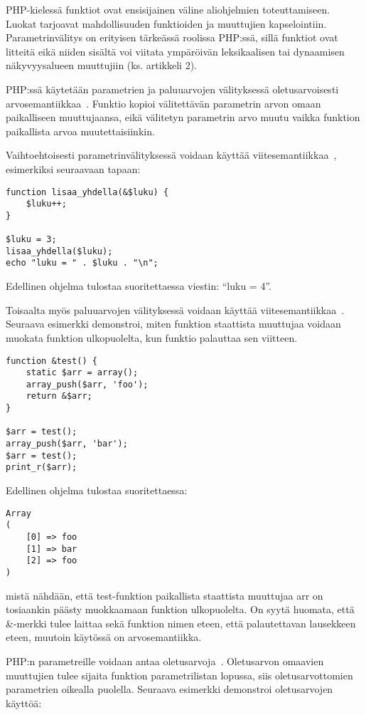 PHP-kielessä funktiot ovat ensisijainen väline aliohjelmien toteuttamiseen. Luokat tarjoavat mahdollisuuden funktioiden ja muuttujien kapselointiin. Parametrinvälitys on erityisen tärkeässä roolissa PHP:ssä, sillä funktiot ovat litteitä eikä niiden sisältä voi viitata ympäröivän leksikaalisen tai dynaamisen näkyvyysalueen muuttujiin (ks. artikkeli 2).

PHP:ssä käytetään parametrien ja paluuarvojen välityksessä oletusarvoisesti arvosemantiikkaa~\cite{man_php_args}. Funktio kopioi välitettävän parametrin arvon omaan paikalliseen muuttujaansa, eikä välitetyn parametrin arvo muutu vaikka funktion paikallista arvoa muutettaisiinkin.

Vaihtoehtoisesti parametrinvälityksessä voidaan käyttää viitesemantiikkaa~\cite{man_php_args}, esimerkiksi seuraavaan tapaan: 

\begin{lstlisting}
function lisaa_yhdella(&$luku) {
    $luku++;
}

$luku = 3;
lisaa_yhdella($luku);
echo "luku = " . $luku . "\n";
\end{lstlisting}

Edellinen ohjelma tulostaa suoritettaessa viestin: “luku = 4”.

Toisaalta myös paluuarvojen välityksessä voidaan käyttää viitesemantiikkaa~\cite{man_php_ret_ref}. Seuraava esimerkki demonstroi, miten funktion staattista muuttujaa voidaan muokata funktion ulkopuolelta, kun funktio palauttaa sen viitteen.

\begin{lstlisting}
function &test() {
    static $arr = array();
    array_push($arr, 'foo');
    return &$arr;
}

$arr = test();
array_push($arr, 'bar');
$arr = test();
print_r($arr);
\end{lstlisting}

Edellinen ohjelma tulostaa suoritettaessa:
\begin{lstlisting}
Array
(
    [0] => foo
    [1] => bar
    [2] => foo
)
\end{lstlisting}

mistä nähdään, että test-funktion paikallista staattista muuttujaa arr on tosiaankin päästy muokkaamaan funktion ulkopuolelta. On syytä huomata, että \&-merkki tulee laittaa sekä funktion nimen eteen, että palautettavan lausekkeen eteen, muutoin käytössä on arvosemantiikka.

PHP:n parametreille voidaan antaa oletusarvoja~\cite{man_php_args}. Oletusarvon omaavien muuttujien tulee sijaita funktion parametrilistan lopussa, siis oletusarvottomien parametrien oikealla puolella. Seuraava esimerkki demonstroi oletusarvojen käyttöä:

